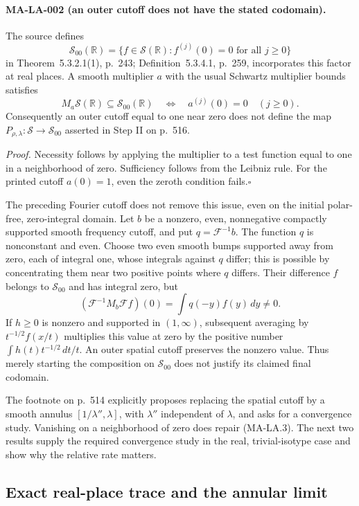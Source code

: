 \paragraph{MA-LA-002 (an outer cutoff does not have the stated codomain).}
The source defines
\[
 \mathcal S_{00}(\mathbb R)
 =\{f\in\mathcal S(\mathbb R):f^{(j)}(0)=0\text{ for all }j\ge0\}
\]
in Theorem~5.3.2.1(1), p.~243; Definition~5.3.4.1, p.~259,
incorporates this factor at real places.  A smooth multiplier $a$ with
the usual Schwartz multiplier bounds satisfies
\[
 M_a\mathcal S(\mathbb R)\subseteq\mathcal S_{00}(\mathbb R)
 \quad\Longleftrightarrow\quad
 a^{(j)}(0)=0\quad(j\ge0).
 \tag{MA-LA.3}
\]
Consequently an outer cutoff equal to one near zero does not define
the map $P_{\rho,\lambda}:\mathcal S\to\mathcal S_{00}$ asserted
in Step II on p.~516.

\emph{Proof.}
Necessity follows by applying the multiplier to a test function equal
to one in a neighborhood of zero.  Sufficiency follows from the
Leibniz rule.  For the printed cutoff $a(0)=1$, even the zeroth
condition fails.\hfill$\square$

The preceding Fourier cutoff does not remove this issue, even on the
initial polar-free, zero-integral domain.  Let $b$ be a nonzero, even,
nonnegative compactly supported smooth frequency cutoff, and put
$q=\mathcal F^{-1}b$.  The function $q$ is nonconstant and even.
Choose two even smooth bumps supported away from zero, each of
integral one, whose integrals against $q$ differ; this is possible
by concentrating them near two positive points where $q$ differs.
Their difference $f$ belongs to $\mathcal S_{00}$ and has integral
zero, but
\[
 (\mathcal F^{-1}M_b\mathcal Ff)(0)=\int q(-y)f(y)\,dy\ne0.
\]
If $h\ge0$ is nonzero and supported in $(1,\infty)$, subsequent
averaging by $t^{-1/2}f(x/t)$ multiplies this value at zero by the
positive number $\int h(t)t^{-1/2}\,dt/t$.  An outer spatial cutoff
preserves the nonzero value.  Thus merely starting the composition
on $\mathcal S_{00}$ does not justify its claimed final codomain.

The footnote on p.~514 explicitly proposes replacing the spatial
cutoff by a smooth annulus $[1/\lambda'',\lambda]$, with
$\lambda''$ independent of $\lambda$, and asks for a convergence
study.  Vanishing on a neighborhood of zero does repair (MA-LA.3).
The next two results supply the required convergence study in the
real, trivial-isotype case and show why the relative rate matters.

\subsection{Exact real-place trace and the annular limit}

